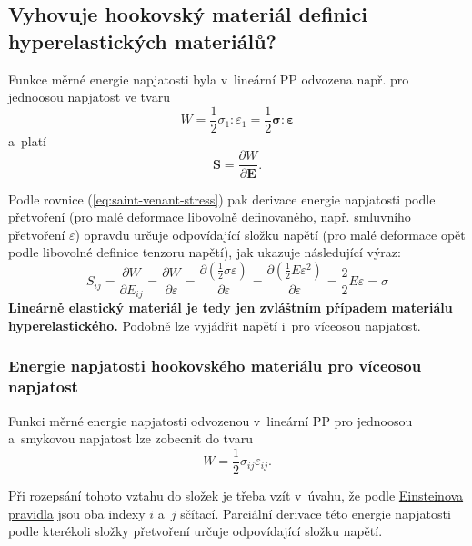
\subsection{Vyhovuje hookovský materiál definici hyperelastických materiálů?}
Funkce měrné energie napjatosti byla v~lineární PP odvozena např. pro jednoosou napjatost ve tvaru
\begin{equation}
	W = \frac{1}{2} \sigma_1:\varepsilon_1 = \frac{1}{2} \bm{\sigma}:\bm{\varepsilon}
\end{equation}
a~platí
\begin{equation}\label{eq:saint-venant-stress}
	\bm{S} = \frac{\partial W}{\partial \bm{E}}.
\end{equation}

Podle rovnice (\ref{eq:saint-venant-stress}) pak derivace energie napjatosti podle přetvoření (pro malé deformace libovolně definovaného, např. smluvního přetvoření $\varepsilon$) opravdu určuje odpovídající složku napětí (pro malé deformace opět podle libovolné definice tenzoru napětí), jak ukazuje následující výraz:
\begin{equation}
	S_{ij} = \frac{\partial W}{\partial E_{ij}}
	= \frac{\partial W}{\partial \varepsilon}
	= \frac{\partial \left(\frac{1}{2} \sigma \varepsilon\right)}{\partial \varepsilon}
	= \frac{\partial \left(\frac{1}{2} E \varepsilon^2\right)}{\partial \varepsilon}
	= \frac{2}{2} E \varepsilon = \sigma
\end{equation}
\textbf{Lineárně elastický materiál je tedy jen zvláštním případem materiálu hyperelastického.}
Podobně lze vyjádřit napětí i~pro víceosou napjatost.

\subsubsection{Energie napjatosti hookovského materiálu pro víceosou napjatost}
Funkci měrné energie napjatosti odvozenou v~lineární PP pro jednoosou a~smykovou napjatost lze zobecnit do tvaru
\begin{equation}
	W = \frac{1}{2} \sigma_{ij} \varepsilon_{ij}.
\end{equation}

Při rozepsání tohoto vztahu do složek je třeba vzít v~úvahu, že podle \hyperref[sec:einsteinovo-scitaci-pravidlo]{Einsteinova pravidla} jsou oba indexy $i$ a~$j$ sčítací.
Parciální derivace této energie napjatosti podle kterékoli složky přetvoření určuje odpovídající složku napětí.
